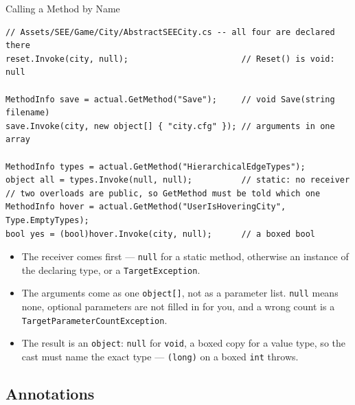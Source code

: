 \begin{frame}[fragile]{Calling a Method by Name}
  \begin{lstlisting}[basicstyle=\scriptsize\ttfamily]
// Assets/SEE/Game/City/AbstractSEECity.cs -- all four are declared there
reset.Invoke(city, null);                       // Reset() is void: null

MethodInfo save = actual.GetMethod("Save");     // void Save(string filename)
save.Invoke(city, new object[] { "city.cfg" }); // arguments in one array

MethodInfo types = actual.GetMethod("HierarchicalEdgeTypes");
object all = types.Invoke(null, null);          // static: no receiver
// two overloads are public, so GetMethod must be told which one
MethodInfo hover = actual.GetMethod("UserIsHoveringCity", Type.EmptyTypes);
bool yes = (bool)hover.Invoke(city, null);      // a boxed bool
  \end{lstlisting}
  \vspace{1ex}

  \begin{itemize}
    \item The receiver comes first --- \texttt{null} for a static method,
      otherwise an instance of the declaring type, or a
      \texttt{TargetException}.
    \item The arguments come as one \texttt{object[]}, not as a parameter list.
      \texttt{null} means none, optional parameters are not filled in for you,
      and a wrong count is a \texttt{TargetParameterCountException}.
    \item The result is an \texttt{object}: \texttt{null} for \texttt{void}, a
      boxed copy for a value type, so the cast must name the exact type ---
      \texttt{(long)} on a boxed \texttt{int} throws.
  \end{itemize}
\end{frame}

\subsection{Annotations}

